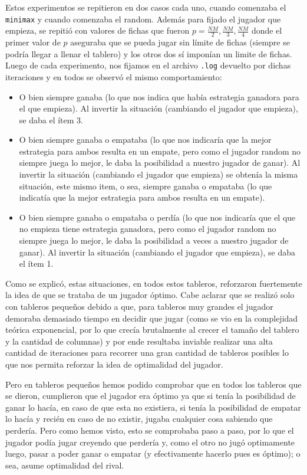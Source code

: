 \documentclass[A4paper,oneside,fleqn,11pt]{article}
\theoremstyle{definition}
\begin{document}
Estos experimentos se repitieron en dos casos cada uno, cuando comenzaba el \texttt{minimax} y cuando comenzaba el random. Además para fijado el jugador que empieza, se repitió con valores de fichas que fueron $p=\frac{NM}{2}, \frac{NM}{3}, \frac{NM}{4}$ donde el primer valor de $p$ aseguraba que se pueda jugar sin límite de fichas (siempre se podría llegar a llenar el tablero) y los otros dos sí imponían un limite de fichas. Luego de cada experimento, nos fijamos en el archivo \texttt{.log} devuelto por dichas iteraciones y en todos se observó el mismo comportamiento:
\begin{itemize}
\item O bien siempre ganaba (lo que nos indica que había estrategia ganadora para el que empieza). Al invertir la situación (cambiando el jugador que empieza), se daba el ítem 3.
\item O bien siempre ganaba o empataba (lo que nos indicaría que la mejor estrategia para ambos resulta en un empate, pero como el jugador random no siempre juega lo mejor, le daba la posibilidad a nuestro jugador de ganar). Al invertir la situación (cambiando el jugador que empieza) se obtenía la misma situación, este mismo item, o sea, siempre ganaba o empataba (lo que indicatía que la mejor estrategia para ambos resulta en un empate).
\item O bien siempre ganaba o empataba o perdía (lo que nos indicaría que el que no empieza tiene estrategia ganadora, pero como el jugador random no siempre juega lo mejor, le daba la posibilidad a veces a nuestro jugador de ganar). Al invertir la situación (cambiando el jugador que empieza), se daba el ítem 1.
\end{itemize}

Como se explicó, estas situaciones, en todos estos tableros, reforzaron fuertemente la idea de que se trataba de un jugador óptimo. Cabe aclarar que se realizó solo con tableros pequeños debido a que, para tableros muy grandes el jugador demoraba demasiado tiempo en decidir que jugar (como se vio en la complejidad teórica exponencial, por lo que crecía brutalmente al crecer el tamaño del tablero y la cantidad de columnas) y por ende resultaba inviable realizar una alta cantidad de iteraciones para recorrer una gran cantidad de tableros posibles lo que nos permita reforzar la idea de optimalidad del jugador. 

Pero en tableros pequeños hemos podido comprobar que en todos los tableros que se dieron, cumplieron que el jugador era óptimo ya que si tenía la posibilidad de ganar lo hacía, en caso de que esta no existiera, si tenía la posibilidad de empatar lo hacía y recién en caso de no existir, jugaba cualquier cosa sabiendo que perdería. Pero como hemos visto, esto se comprobaba paso a paso, por lo que el jugador podía jugar creyendo que perdería y, como el otro no jugó optimamente luego, pasar a poder ganar o empatar (y efectivamente hacerlo pues es óptimo); o sea, asume optimalidad del rival.
\end{document}
